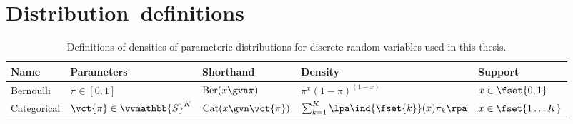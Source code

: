 \chapter{\mbox{Distribution definitions}}\label{app:distribution-definitions}


\begin{landscape}

\vspace*{-8mm}
\begin{table}[H]
\centering
\begin{tabular}{p{4cm}p{5cm}lll}
\toprule
  \textsf{Name} & \textsf{Parameters} & \textsf{Shorthand} & \textsf{Density} & Support \\
\midrule
  Bernoulli & 
  $\pi \in [0,1]$ &
  $\textrm{Ber}(x \gvn \pi)$ & 
  $\pi^x (1 -\pi)^{(1-x)}$ &
  $x \in \fset{0,1}$\\
  Categorical & 
  $\vct{\pi} \in \vvmathbb{S}^K$ &
  $\textrm{Cat}(x \gvn \vct{\pi})$ & 
  $\sum_{k=1}^K \lpa \ind{\fset{k}}(x) \pi_k \rpa$ &
  $x \in \fset{1 \dots K}$\\
\bottomrule
\end{tabular}
\caption[Standard discrete density definitions.]{Definitions of densities of parameteric distributions for discrete random variables used in this thesis.}
\label{tab:standard-distributions-discrete}
\end{table}


\end{landscape}

